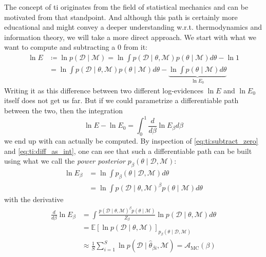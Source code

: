 \documentclass[\relativeRoot/main.tex]{subfiles}
\begin{document}
The concept of \gls{ti} originates from the field of statistical mechanics and can be motivated from that standpoint. And although this path is certainly more educational and might convey a deeper understanding w.r.t. thermodynamics and information theory, we will take a more direct approach. We start with what we want to compute and subtracting a 0 from it:
%
\begin{equation} \label{eq:ti:subtract_zero}
    \begin{aligned}
        \ln{E} &\coloneqq \ln{p(\boldsymbol{\mathcal{D}} \mid \mathcal{M})} = \ln{\int{ p\left( \boldsymbol{\mathcal{D}} \mid \theta, \mathcal{M} \right) p(\theta \mid \mathcal{M}) d\theta}} - \ln{1} \\
        &= \ln{\int{ p\left( \boldsymbol{\mathcal{D}} \mid \theta, \mathcal{M} \right) p(\theta \mid \mathcal{M}) d\theta}} - \underbrace{ \ln{ \int{ p(\theta \mid \mathcal{M}) d\theta} } }_{\ln{E_0}}
    \end{aligned}
\end{equation}
%
Writing it as this difference between two different log-evidences $\ln{E}$ and $\ln{E_0}$ itself does not get us far. But if we could parametrize a differentiable path between the two, then the integration
%
\begin{equation} \label{eq:ti:diff_as_int}
    \ln{E} - \ln{E_0} = \int_0^1{ \frac{d}{d\beta} \ln{E_\beta} d\beta}
\end{equation}
%
we end up with can actually be computed. By inspection of \cref{eq:ti:subtract_zero} and \cref{eq:ti:diff_as_int}, one can see that such a differentiable path can be built using what we call the \emph{power posterior} $p_\beta (\theta \mid \boldsymbol{\mathcal{D}}, \mathcal{M})$:
%
\begin{equation} \label{eq:ti:power_post}
    \begin{aligned}
        \ln{E_\beta} &= \ln{ \int{ p_\beta (\theta \mid \boldsymbol{\mathcal{D}}, \mathcal{M}) d\theta} } \\
        &= \ln{\int{ p\left( \boldsymbol{\mathcal{D}} \mid \theta, \mathcal{M} \right)^\beta p(\theta \mid \mathcal{M}) d\theta}}
    \end{aligned}
\end{equation}
%
with the derivative
%
\begin{equation} \label{eq:ti:accuracy}
    \begin{aligned}
        \frac{d}{d\beta} \ln{E_\beta} &= \int{ \frac{p\left( \boldsymbol{\mathcal{D}} \mid \theta, \mathcal{M} \right)^\beta p(\theta \mid \mathcal{M})}{Z_\beta} \ln{p(\boldsymbol{\mathcal{D}} \mid \theta, \mathcal{M} )} d\theta} \\
        &= \mathbb{E}\left[ \ln{ p(\boldsymbol{\mathcal{D}} \mid \theta, \mathcal{M}) } \right]_{p_\beta (\theta \mid \boldsymbol{\mathcal{D}}, \mathcal{M})} \\
        &\approx \frac{1}{S} \sum_{i=1}^S{ \ln{ p(\boldsymbol{\mathcal{D}} \mid \hat{\theta}_{\beta i}, \mathcal{M}) } } = \mathcal{A}_\text{MC}(\beta)
    \end{aligned}
\end{equation}
\end{document}
